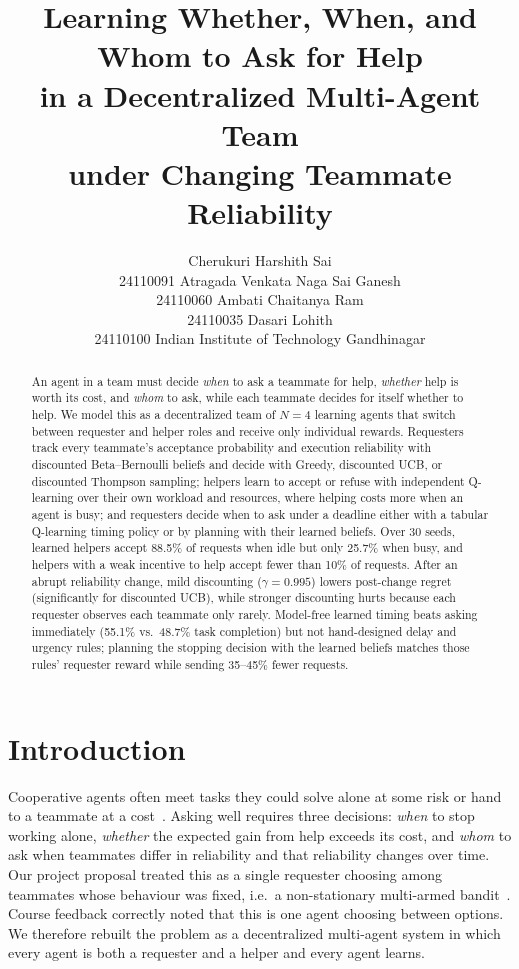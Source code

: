 \documentclass{article}
\title{Learning Whether, When, and Whom to Ask for Help\\in a Decentralized Multi-Agent Team\\under Changing Teammate Reliability}
\author{
  Cherukuri Harshith Sai \\ 24110091 \And
  Atragada Venkata Naga Sai Ganesh \\ 24110060 \And
  Ambati Chaitanya Ram \\ 24110035 \And
  Dasari Lohith \\ 24110100 \AND
  Indian Institute of Technology Gandhinagar
}
\date{}
\begin{document}
\maketitle

\begin{abstract}
An agent in a team must decide \emph{when} to ask a teammate for help, \emph{whether} help is worth its cost, and \emph{whom} to ask, while each teammate decides for itself whether to help. We model this as a decentralized team of $N=4$ learning agents that switch between requester and helper roles and receive only individual rewards. Requesters track every teammate's acceptance probability and execution reliability with discounted Beta--Bernoulli beliefs and decide with Greedy, discounted UCB, or discounted Thompson sampling; helpers learn to accept or refuse with independent Q-learning over their own workload and resources, where helping costs more when an agent is busy; and requesters decide when to ask under a deadline either with a tabular Q-learning timing policy or by planning with their learned beliefs. Over 30 seeds, learned helpers accept 88.5\% of requests when idle but only 25.7\% when busy, and helpers with a weak incentive to help accept fewer than 10\% of requests. After an abrupt reliability change, mild discounting ($\gamma=0.995$) lowers post-change regret (significantly for discounted UCB), while stronger discounting hurts because each requester observes each teammate only rarely. Model-free learned timing beats asking immediately (55.1\% vs.\ 48.7\% task completion) but not hand-designed delay and urgency rules; planning the stopping decision with the learned beliefs matches those rules' requester reward while sending 35--45\% fewer requests.
\end{abstract}

\section{Introduction}\label{sec:intro}
Cooperative agents often meet tasks they could solve alone at some risk or hand to a teammate at a cost~\cite{panait2005cooperative,stone2010adhoc,torrey2013teaching}. Asking well requires three decisions: \emph{when} to stop working alone, \emph{whether} the expected gain from help exceeds its cost, and \emph{whom} to ask when teammates differ in reliability and that reliability changes over time. Our project proposal treated this as a single requester choosing among teammates whose behaviour was fixed, i.e.\ a non-stationary multi-armed bandit~\cite{auer2002finite,garivier2011ucb,besbes2014stochastic}. Course feedback correctly noted that this is one agent choosing between options. We therefore rebuilt the problem as a decentralized multi-agent system in which every agent is both a requester and a helper and every agent learns.
\end{document}

